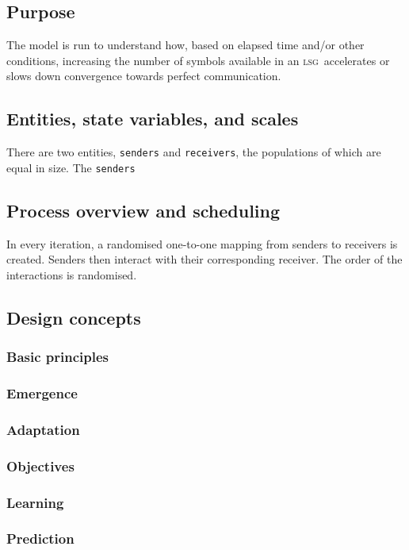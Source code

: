 \documentclass[DIV=calc,BCOR=0mm,pagesize]{scrartcl}
\newcommand{\code}[1]{\texttt{#1}}
\newcommand{\lsg}{\textsc{lsg}}
\begin{document}
\subsection{Purpose}
\label{ssec:modpur}
The model is run to understand how, based on elapsed time and/or other conditions, increasing the number of symbols available in an \lsg\ accelerates or slows down convergence towards perfect communication.

\subsection{Entities, state variables, and scales}
\label{ssec:modent}
There are two entities, \code{senders} and \code{receivers}, the populations of which are equal in size.
The \code{senders}


\subsection{Process overview and scheduling}
\label{ssec:modpro}
In every iteration, a randomised one-to-one mapping from senders to receivers is created.  %
Senders then interact with their corresponding receiver.
The order of the interactions is randomised.

\subsection{Design concepts}
\label{ssec:moddes}
\subsubsection{Basic principles}
\subsubsection{Emergence}
\subsubsection{Adaptation}
\subsubsection{Objectives}
\subsubsection{Learning}
\subsubsection{Prediction}
\end{document}

